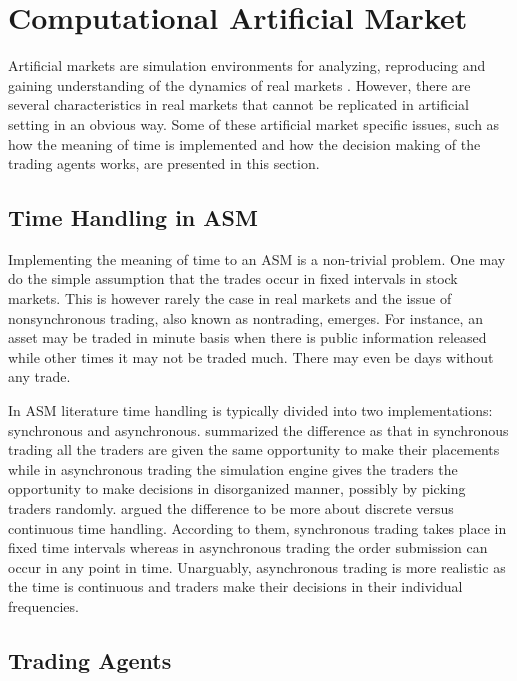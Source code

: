 \section{Computational Artificial Market}
Artificial markets are simulation environments for analyzing, 
reproducing and gaining understanding of the dynamics of 
real markets \citet{Julien07}. However, there are several 
characteristics in real markets that cannot be replicated
in artificial setting in an obvious way. Some of these artificial
market specific issues, such as how the meaning of time is 
implemented and how the decision making of the trading agents
works, are presented in this section.


\subsection{Time Handling in ASM}

Implementing the meaning of time to an ASM is a non-trivial problem.
One may do the simple assumption that the trades occur in fixed
intervals in stock markets. This is however rarely the case in real markets
and the issue of nonsynchronous trading, also known as nontrading, emerges. 
For instance, an asset may be traded in minute basis when there is
public information released while other times it may not be traded much.
There may even be days without any trade. \citep{Econometrics} 

In ASM literature time handling is typically divided into two implementations:
synchronous and asynchronous. \citet{Julien07} summarized the difference as that in synchronous
trading all the traders are given the same opportunity to make their placements
while in asynchronous trading the simulation engine gives the traders the opportunity to
make decisions in disorganized manner, possibly by picking traders randomly.
\citet{Ben17} argued the difference to be more about discrete versus continuous time handling.
According to them, synchronous trading takes place in fixed time intervals whereas in 
asynchronous trading the order submission can occur in any point in time. Unarguably, 
asynchronous trading is more realistic as the time is continuous and traders make
their decisions in their individual frequencies.


\subsection{Trading Agents}
\label{section:ASMTradingAgents}

